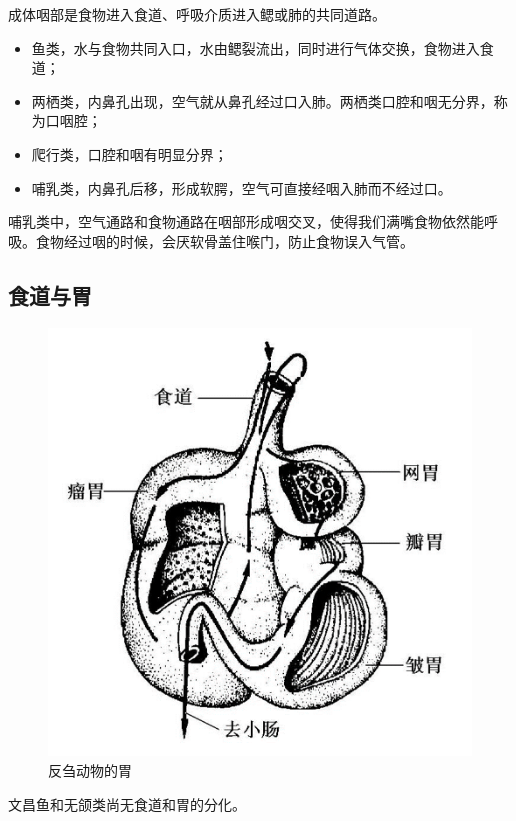 成体咽部是食物进入食道、呼吸介质进入鳃或肺的共同道路。

\begin{itemize}
	\item 鱼类，水与食物共同入口，水由鳃裂流出，同时进行气体交换，食物进入食道；
	\item 两栖类，内鼻孔出现，空气就从鼻孔经过口入肺。两栖类口腔和咽无分界，称为口咽腔；
	\item 爬行类，口腔和咽有明显分界；
	\item 哺乳类，内鼻孔后移，形成软腭，空气可直接经咽入肺而不经过口。
\end{itemize}

哺乳类中，空气通路和食物通路在咽部形成咽交叉，使得我们满嘴食物依然能呼吸。食物经过咽的时候，会厌软骨盖住喉门，防止食物误入气管。

\subsection{食道与胃}

\begin{figure}
	\centering
	\includegraphics[width=\linewidth]{Pics/反刍胃}
	\caption{反刍动物的胃}
	\label{fig:cow_stomach}
\end{figure}

文昌鱼和无颌类尚无食道和胃的分化。

